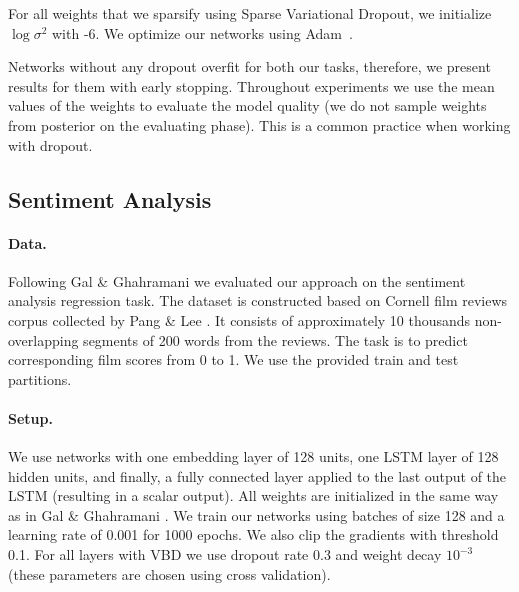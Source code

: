 \documentclass{article}
\begin{document}
For all weights that we sparsify using Sparse Variational Dropout, we initialize $\log{\sigma^2}$ with -6. 
We optimize our networks using Adam~\cite{adam}. 

Networks without any dropout overfit for both our tasks, therefore, we present results for them with early stopping. Throughout experiments we use the mean values of the weights to evaluate the model quality (we do not sample weights from posterior on the evaluating phase). This is a common practice when working with dropout.

\subsection{Sentiment Analysis}
\vspace{-1mm}
\paragraph{Data.} Following Gal \& Ghahramani  we evaluated our approach on the sentiment analysis regression task. The dataset is constructed based on Cornell film reviews corpus collected by Pang \& Lee . It consists of approximately 10 thousands non-overlapping segments of 200 words from the reviews. The task is to predict corresponding film scores from 0 to 1. We use the provided train and test partitions.
\vspace{-2mm}
\paragraph{Setup.} We use networks with one embedding layer of 128 units, one LSTM layer of 128 hidden units, and finally, a fully connected layer applied to the last output of the LSTM (resulting in a scalar output). All weights are initialized in the same way as in Gal \& Ghahramani . We train our networks using batches of size 128 and a learning rate of 0.001 for 1000 epochs. We also clip the gradients with threshold 0.1. For all layers with VBD we use dropout rate 0.3 and weight decay $10^{-3}$ (these parameters are chosen using cross validation).
\vspace{-2mm}
\end{document}

